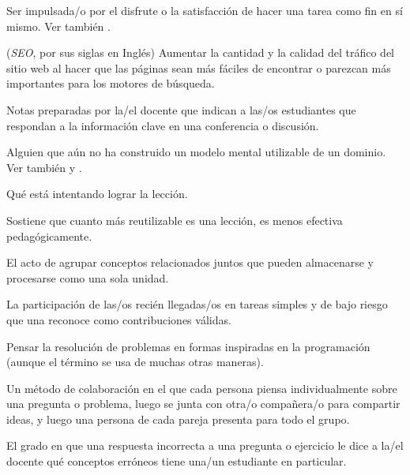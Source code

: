 \begin{description}
 Ser impulsada/o por el disfrute o
la satisfacción de hacer una tarea como fin en sí mismo.  Ver también
.

 (\emph{SEO}, por sus siglas en Inglés)  Aumentar la cantidad y la calidad del tráfico del sitio web al hacer que las páginas sean más fáciles de encontrar o parezcan más importantes para los motores de búsqueda.

 Notas preparadas por la/el docente que indican a las/os estudiantes que respondan a la información clave en una conferencia o discusión.

 Alguien que aún no ha construido un modelo mental utilizable de un dominio. Ver también  y .

 Qué está intentando lograr la lección.

 Sostiene que cuanto más reutilizable es una lección, es menos efectiva pedagógicamente.

 El acto de agrupar conceptos relacionados juntos
que pueden almacenarse y procesarse como una sola unidad.

 La participación de las/os recién llegadas/os en tareas simples y de bajo riesgo que una  
 reconoce como contribuciones válidas.

 Pensar la
resolución de problemas en formas inspiradas en la programación (aunque el término se usa de muchas otras maneras).

 Un método de colaboración
en el que cada persona piensa individualmente sobre una pregunta o problema,
luego se junta con otra/o compañera/o para compartir ideas, y luego una persona de
cada pareja presenta para todo el grupo.

 El grado en que una respuesta incorrecta
a una pregunta o ejercicio le dice a la/el docente qué conceptos erróneos tiene una/un estudiante en particular.


\end{description}
